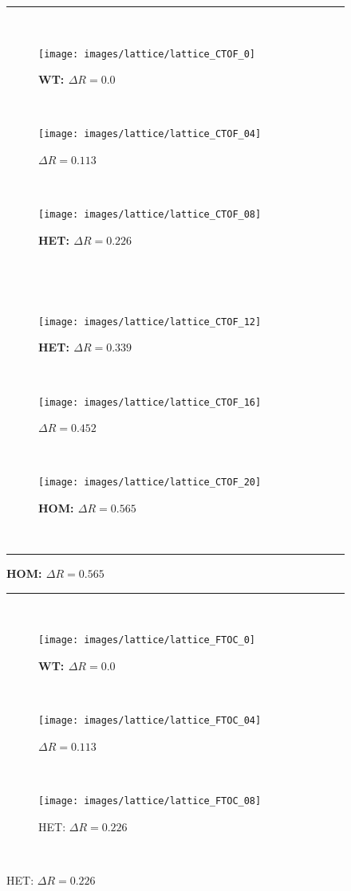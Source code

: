 \begin{landscape}
\begin{figure}[h!]
\hrule width1.505\textwidth
~\unskip\ \vrule\ 
\begin{subfigure}{0.475\textwidth}
	\caption{\textbf{WT: $\Delta R =  0.0$}}
	\texttt{[image: images/lattice/lattice\_CTOF\_0]}
\end{subfigure}
~\unskip\ \vrule\ 
\begin{subfigure}{0.475\textwidth}
	\caption{\textbf{$\Delta R =  0.113$}}
	\texttt{[image: images/lattice/lattice\_CTOF\_04]}

\end{subfigure}
~\unskip\ \vrule\ 
\begin{subfigure}{0.475\textwidth}
	\caption{\textbf{HET: $\Delta R =  0.226$}}
	\texttt{[image: images/lattice/lattice\_CTOF\_08]}
\end{subfigure}
~\unskip\ \vrule\ 

~\unskip\ \vrule\ 
\begin{subfigure}{0.475\textwidth}
		\caption{\textbf{HET: $\Delta R =  0.339$}}
	\texttt{[image: images/lattice/lattice\_CTOF\_12]}

\end{subfigure}
~\unskip\ \vrule\ 
\begin{subfigure}{0.475\textwidth}
		\caption{\textbf{$\Delta R =  0.452$}}
	\texttt{[image: images/lattice/lattice\_CTOF\_16]}

\end{subfigure}
~\unskip\ \vrule\ 
\begin{subfigure}{0.475\textwidth}
		\caption{\textbf{HOM: $\Delta R =  0.565$}}
	\texttt{[image: images/lattice/lattice\_CTOF\_20]}

\end{subfigure}
~\unskip\ \vrule\ 
\hrule width1.505\textwidth
\end{figure}

\begin{figure}[h!]
	\hrule width1.505\textwidth
	~\unskip\ \vrule\ 
	\begin{subfigure}{0.475\textwidth}
		\caption{\textbf{WT: $\Delta R =  0.0$}}
		\texttt{[image: images/lattice/lattice\_FTOC\_0]}
	\end{subfigure}
	~\unskip\ \vrule\ 
	\begin{subfigure}{0.475\textwidth}
		\caption{\textbf{$\Delta R =  0.113$}}
		\texttt{[image: images/lattice/lattice\_FTOC\_04]}
		
	\end{subfigure}
	~\unskip\ \vrule\ 
	\begin{subfigure}{0.475\textwidth}
		\caption{HET: $\Delta R =  0.226$}
		\texttt{[image: images/lattice/lattice\_FTOC\_08]}
	\end{subfigure}
	~\unskip\ \vrule\ 
	

\end{figure}
\end{landscape}
